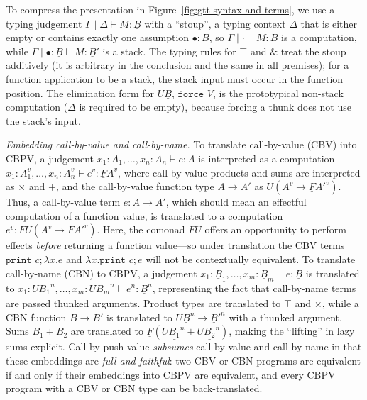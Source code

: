 \documentclass[acmsmall,nonacm]{acmart}
\newif\ifshort
\renewcommand{\u}{\underline}
\newcommand{\print}{\kw{print}}
\newcommand{\kw}[1]{\texttt{#1}\,\,}
\newcommand{\force}{\kw{force}}
\newcommand{\with}{\mathbin{\&}}
\begin{document}
To compress the presentation in Figure~\ref{fig:gtt-syntax-and-terms},
we use a typing judgement $\Gamma \mid \Delta \vdash M : \u B$ with a
``stoup'', a typing context $\Delta$ that is either
empty or contains exactly one assumption $\bullet : \u B$, so $\Gamma
\mid \cdot \vdash M : \u B$ is a computation, while $\Gamma \mid \bullet
: \u B \vdash M : \u B'$ is a stack.  The \ifshort{(omitted) }\fi typing
rules for $\top$ and $\with$ treat the stoup additively
(it is arbitrary in the conclusion and the same in all premises); for a
function application to be a stack, the stack input must occur in the
function position.  The elimination form for $U \u B$, $\force{V}$, is
the prototypical non-stack computation ($\Delta$ is required to be
empty), because forcing a thunk does not use the stack's input.

\emph{Embedding call-by-value and call-by-name.}  To translate
call-by-value (CBV) into CBPV, a judgement $x_1 : A_1, \ldots, x_n : A_n
\vdash e : A$ is interpreted as a computation $x_1 : A_1^v, \ldots, x_n
: A_n^v \vdash e^v : \u F A^v$, where call-by-value products and sums
are interpreted as $\times$ and $+$, and the call-by-value function type
$A \to A'$ as $U(A^v \to \u F A'^v)$.  Thus, a call-by-value term $e : A
\to A'$, which should mean an effectful computation of a function value,
is translated to a computation $e^v : \u F U (A^v \to \u F A'^v)$. Here,
the comonad $\u F U$ offers an opportunity to perform effects
\emph{before} returning a function value---so under translation the CBV
terms $\print c; \lambda x. e$ and $\lambda x.\print c; e$ will not be
contextually equivalent.  To translate call-by-name (CBN) to CBPV, a
judgement $x_1 : \u B_1, \ldots, x_m : \u B_m \vdash e : \u B$ is
translated to $x_1 : U \u {B_1}^n, \ldots, x_m : U \u {B_m}^n \vdash e^n
: \u B^n$, representing the fact that call-by-name terms are passed
thunked arguments.  Product types are translated to $\top$ and $\times$,
while a CBN function $B \to B'$ is translated to $U \u B^n \to \u B'^n$
with a thunked argument.  Sums $B_1 + B_2$ are translated to $\u F (U \u
{B_1}^n + U \u {B_2}^n)$, making the ``lifting'' in lazy sums explicit.
Call-by-push-value \emph{subsumes} call-by-value and call-by-name in
that these embeddings are \emph{full and faithful}: two CBV or CBN programs are
equivalent if and only if their embeddings into CBPV are equivalent, and
every CBPV program with a CBV or CBN type can be back-translated.

\end{document}
